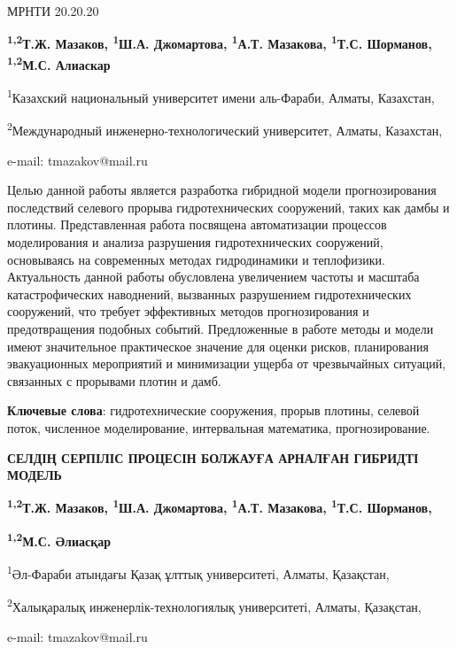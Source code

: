 МРНТИ 20.20.20


\begin{center}
{\bfseries \textsuperscript{1,2}Т.Ж. Мазаков, \textsuperscript{1}Ш.А.
Джомартова, \textsuperscript{1}А.Т. Мазакова, \textsuperscript{1}Т.С.
Шорманов, \textsuperscript{1,2}М.С. Алиаскар}

\textsuperscript{1}Казахский национальный университет имени аль-Фараби,
Алматы, Казахстан,

\textsuperscript{2}Международный инженерно-технологический университет,
Алматы, Казахстан,

e-mail: tmazakov@mail.ru
\end{center}

Целью данной работы является разработка гибридной модели прогнозирования
последствий селевого прорыва гидротехнических сооружений, таких как
дамбы и плотины. Представленная работа посвящена автоматизации процессов
моделирования и анализа разрушения гидротехнических сооружений,
основываясь на современных методах гидродинамики и теплофизики.
Актуальность данной работы обусловлена увеличением частоты и масштаба
катастрофических наводнений, вызванных разрушением гидротехнических
сооружений, что требует эффективных методов прогнозирования и
предотвращения подобных событий. Предложенные в работе методы и модели
имеют значительное практическое значение для оценки рисков, планирования
эвакуационных мероприятий и минимизации ущерба от чрезвычайных ситуаций,
связанных с прорывами плотин и дамб.

{\bfseries Ключевые слова}: гидротехнические сооружения, прорыв плотины,
селевой поток, численное моделирование, интервальная математика,
прогнозирование.

\begin{center}
{\large\bfseries СЕЛДІҢ СЕРПІЛІС ПРОЦЕСІН БОЛЖАУҒА АРНАЛҒАН ГИБРИДТІ МОДЕЛЬ}

{\bfseries \textsuperscript{1,2}Т.Ж. Мазаков, \textsuperscript{1}Ш.А.
Джомартова, \textsuperscript{1}А.Т. Мазакова, \textsuperscript{1}Т.С.
Шорманов,}

{\bfseries \textsuperscript{1,2}М.С. Әлиасқар}

\textsuperscript{1}Әл-Фараби атындағы Қазақ ұлттық университеті, Алматы,
Қазақстан,

\textsuperscript{2}Халықаралық инженерлік-технологиялық университеті,
Алматы, Қазақстан,

e-mail: tmazakov@mail.ru
\end{center}

